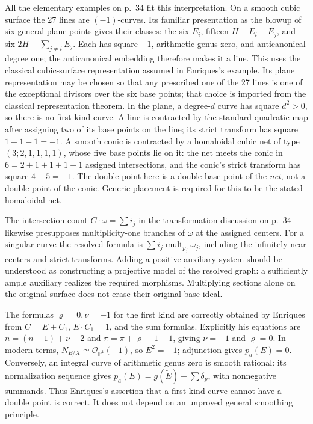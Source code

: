 All the elementary examples on p.~34 fit this interpretation. On a smooth cubic surface the 27 lines are \((-1)\)-curves. Its familiar presentation as the blowup of six general plane points gives their classes: the six \(E_i\), fifteen \(H-E_i-E_j\), and six \(2H-\sum_{j\ne i}E_j\). Each has square \(-1\), arithmetic genus zero, and anticanonical degree one; the anticanonical embedding therefore makes it a line. This uses the classical cubic-surface representation assumed in Enriques's example. Its plane representation may be chosen so that any prescribed one of the 27 lines is one of the exceptional divisors over the six base points; that choice is imported from the classical representation theorem. In the plane, a degree-\(d\) curve has square \(d^2>0\), so there is no first-kind curve. A line is contracted by the standard quadratic map after assigning two of its base points on the line; its strict transform has square \(1-1-1=-1\). A smooth conic is contracted by a homaloidal cubic net of type \((3;2,1,1,1,1)\), whose five base points lie on it: the net meets the conic in \(6=2+1+1+1+1\) assigned intersections, and the conic's strict transform has square \(4-5=-1\). The double point here is a double base point of the \emph{net}, not a double point of the conic. Generic placement is required for this to be the stated homaloidal net.

The intersection count \(C\cdot\omega=\sum i_j\) in the transformation discussion on p.~34 likewise presupposes multiplicity-one branches of \(\omega\) at the assigned centers. For a singular curve the resolved formula is \(\sum i_j\operatorname{mult}_{p_j}\omega_j\), including the infinitely near centers and strict transforms. Adding a positive auxiliary system should be understood as constructing a projective model of the resolved graph: a sufficiently ample auxiliary realizes the required morphisms. Multiplying sections alone on the original surface does not erase their original base ideal.

The formulas \(\varrho=0,\nu=-1\) for the first kind are correctly obtained by Enriques from \(C=E+C_1\), \(E\cdot C_1=1\), and the sum formulas. Explicitly his equations are \(n=(n-1)+\nu+2\) and \(\pi=\pi+\varrho+1-1\), giving \(\nu=-1\) and \(\varrho=0\). In modern terms, \(N_{E/X}\simeq\mathcal O_{\mathbb P^1}(-1)\), so \(E^2=-1\); adjunction gives \(p_a(E)=0\). Conversely, an integral curve of arithmetic genus zero is smooth rational: its normalization sequence gives \(p_a(E)=g(\widetilde E)+\sum\delta_p\), with nonnegative summands. Thus Enriques's assertion that a first-kind curve cannot have a double point is correct. It does not depend on an unproved general smoothing principle.

